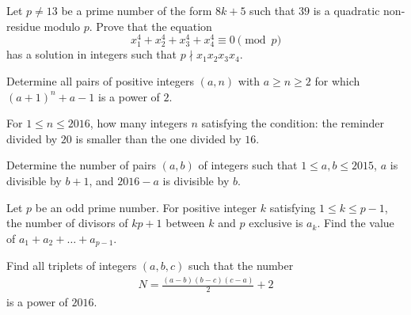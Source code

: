 \documentclass[problems.tex]{subfile}
\begin{document}
	\begin{problem}
		Let $p \neq 13$ be a prime number of the form $8k+5$ such that $39$ is a quadratic non-residue modulo $p$. Prove that the equation $$x_1^4+x_2^4+x_3^4+x_4^4 \equiv 0 \pmod p$$ has a solution in integers such that $p\nmid x_1x_2x_3x_4$. %
	\end{problem}

	\begin{problem}
		Determine all pairs of positive integers $(a,n)$ with $a\ge n\ge 2$ for which $(a+1)^n+a-1$ is a power of $2$. %
	\end{problem}

	\begin{problem}
		For $1\leq n\leq 2016$, how many integers $n$ satisfying the condition: the reminder divided by $20$ is smaller than the one divided by $16$. %
	\end{problem}

	\begin{problem}
		Determine the number of pairs $(a, b)$ of integers such that $1 \leq a, b \leq 2015$, $a$ is divisible by $b + 1$, and $2016 - a$ is divisible by $b$.%
	\end{problem}

	\begin{problem}
		Let $p$ be an odd prime number. For positive integer $k$ satisfying $1\le k\le p-1$, the number of divisors of $kp+1$ between $k$ and $p$ exclusive is $a_k$. Find the value of $a_1+a_2+\ldots + a_{p-1}$. %
	\end{problem}

	\begin{problem}
		Find all triplets of integers $(a,b,c)$ such that the number
			\begin{align*}
				N = \frac{(a-b)(b-c)(c-a)}{2} + 2
			\end{align*}
		is a power of $2016$. %
	\end{problem}
\end{document}
